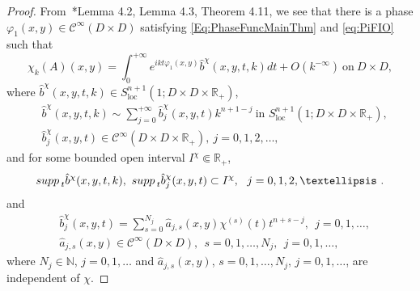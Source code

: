 \documentclass[12pt]{amsart}
\theoremstyle{definition}
\theoremstyle{named}
\numberwithin{equation}{subsection}
\newcommand{\R}{\mathbb{R}}
\def\cC{\mathscr{C}}
\begin{document}
\begin{proof}
From~\cite{HHMS23}*{Lemma 4.2, Lemma 4.3, Theorem 4.11}, we see that there is a phase $\varphi_1(x,y)\in\cC^\infty(D\times D)$  satisfying 
\eqref{Eq:PhaseFuncMainThm} and \eqref{eq:PiFIO} such that 
\begin{equation}\label{e-gue241124ycd}
\chi_k(A)(x,y)=\int_0^{+\infty} 
e^{ikt\varphi_1(x,y)}\hat b^\chi(x,y,t,k)dt+O\left(k^{-\infty}\right)~\text{on}~D\times D,
\end{equation}
where $\hat b^\chi(x,y,t,k)\in S^{n+1}_{\mathrm{loc}}
(1;D\times D\times{\R}_+)$,
\begin{equation}\label{e-gue241124ycdI}
\begin{split}
&\hat b^\chi(x,y,t,k)\sim\sum_{j=0}^{+\infty}\hat b^\chi_{j}(x,y,t)k^{n+1-j}~
\text{in $S^{n+1}_{\mathrm{loc}}(1;D\times D\times{\R}_+)$},\\
&\hat b^\chi_j(x,y,t)\in\mathscr{C}^\infty(D\times D\times{\R}_+),~j=0,1,2,\ldots,
\end{split}
\end{equation}
and for some bounded open interval $I^\chi\Subset\R_+$,
\begin{equation}\label{e-gue241115ycdaz}
\begin{split}
{\rm supp\,}_t\hat b^\chi(x,y,t,k),~{\rm supp\,}_t \hat b^\chi_j(x,y,t)\subset I^\chi,\ \ j=0,1,2,\ldots~.
\end{split}
\end{equation}
and 
\begin{equation}\label{e-gue241124yyd}
\begin{split}
&\hat b^\chi_j(x,y,t)=\sum^{N_j}_{s=0}\hat a_{j,s}(x,y)\chi^{(s)}(t)t^{n+s-j},\ \ j=0,1,\ldots,\\
&\hat a_{j,s}(x,y)\in\cC^\infty(D\times D),\ \ s=0,1,\ldots,N_j,\ \ j=0,1,\ldots,
\end{split}
\end{equation}
where $N_j\in\mathbb N$, $j=0,1,\ldots$ and \(\hat a_{j,s}(x,y)\), \( s=0,1,\ldots,N_j,\,  j=0,1,\ldots\), are independent of \(\chi\). 


\end{proof}
\end{document}
